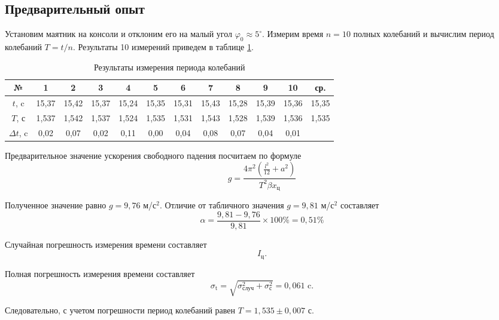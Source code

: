 \documentclass[a4paper,12pt]{article}
\begin{document}
 	\subsection{Предварительный опыт}
 	Установим маятник на консоли и отклоним его на малый угол $\varphi_0 \approx 5^\circ$. Измерим время $n = 10$ полных колебаний и вычислим период колебаний $T = t/n$. Результаты 10 измерений приведем в таблице \ref{tab1}.
 	\begin{table}[H]
 		\begin{center}
 			\begin{tabular}{|c|c|c|c|c|c|c|c|c|c|c|c|}
 				\hline
 				№ & 1 & 2 & 3 & 4 & 5 & 6 & 7 & 8 & 9 & 10 & ср. \\
 				\hline
 				$t$, c & 15,37 & 15,42 & 15,37 & 15,24 & 15,35 & 15,31 & 15,43 & 15,28 & 15,39 & 15,36 & 15,35\\ 
 				\hline
 				$T$, с & 1,537 & 1,542 & 1,537 & 1,524 & 1,535 & 1,531 & 1,543 & 1,528 & 1,539 & 1,536 & 1,535\\ 
 				\hline
 				$\Delta t$, c& 0,02 & 0,07 & 0,02 & 0,11 & 0,00 & 0,04 & 0,08 & 0,07 & 0,04 & 0,01 & \\
 				\hline
 			\end{tabular}
 		\end{center}
 		\caption{Результаты измерения периода колебаний}
 		\label{tab1}
 	\end{table}
 	
 	Предварительное значение ускорения свободного падения посчитаем по формуле
 	\begin{equation}\label{golos}
 		g = \frac{4\pi^2 (\frac{l^2}{12} + a^2)}{T^2 \beta x_\text{ц}}
 	\end{equation}
 	\par Полученное значение равно $g = 9,76$ м/с$^2$. Отличие от табличного значения $g = 9,81$ м/с$^2$ составляет 
 	\begin{equation}
 		\alpha = \frac{9,81 - 9,76}{9,81}\times100\% = 0,51\%
 	\end{equation}
 	\par Случайная погрешность измерения времени составляет
 	\begin{equation}
 		I_\text{ц}.
 	\end{equation}
 	\par Полная погрешность измерения времени составляет
 	\begin{equation}
 		\sigma_\text{t} = \sqrt{\sigma_\text{случ}^2+\sigma_\text{с}^2} = 0,061\text{ c}.
 	\end{equation}
 	\par Следовательно, с учетом погрешности период колебаний равен $T = 1,535 \pm 0,007$ с.
 	
\end{document}
